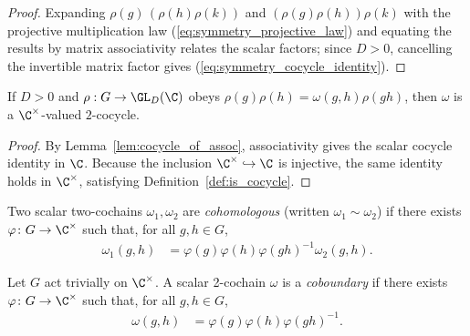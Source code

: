 \begin{proof}\leanok{}
    Expanding $\rho(g)\,(\rho(h)\rho(k))$ and
    $(\rho(g)\rho(h))\rho(k)$ with the projective multiplication law
    (\ref{eq:symmetry_projective_law}) and equating the results by matrix
    associativity relates the scalar factors; since $D > 0$, cancelling the
    invertible matrix factor gives (\ref{eq:symmetry_cocycle_identity}).
\end{proof}

\begin{lemma}
    \label{thm:is_cocycle_of_projective_rep}
    \leanok
    If $D>0$ and $\rho:G\to\GL_D(\C)$ obeys
    $\rho(g)\rho(h)=\omega(g,h)\rho(gh)$, then $\omega$ is a
    $\C^\times$-valued $2$-cocycle.
\end{lemma}

\begin{proof}\leanok
    By Lemma~\ref{lem:cocycle_of_assoc}, associativity gives the scalar
    cocycle identity in $\C$.  Because the inclusion
    $\C^\times\hookrightarrow\C$ is injective, the same identity holds in
    $\C^\times$, satisfying Definition~\ref{def:is_cocycle}.
\end{proof}

\begin{definition}\label{def:cohomologous_to}
    \leanok
    Two scalar two-cochains $\omega_1,\omega_2$ are \emph{cohomologous}
    (written $\omega_1 \sim \omega_2$) if there exists
    $\varphi \colon G \to \C^{\times}$ such that, for all $g,h \in G$,
    \begin{align}
        \omega_1(g,h)
         & =\varphi(g)\varphi(h)\varphi(gh)^{-1}\omega_2(g,h).
        \label{eq:symmetry_cohomologous}
    \end{align}
\end{definition}

\begin{definition}[Coboundary]\label{def:is_coboundary}
    \mathlibok
    Let $G$ act trivially on $\C^{\times}$.
    A scalar 2-cochain $\omega$ is a \emph{coboundary} if there exists
    $\varphi \colon G \to \C^{\times}$ such that, for all $g,h \in G$,
    \begin{align}
        \omega(g,h)
         & =\varphi(g)\varphi(h)\varphi(gh)^{-1}.
        \label{eq:symmetry_coboundary}
    \end{align}
\end{definition}

